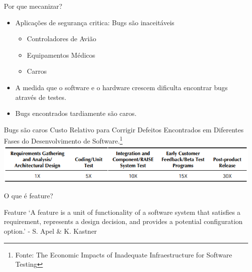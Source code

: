 \documentclass{beamer}
\begin{document}
    \begin{frame}{Por que mecanizar?}
        \begin{itemize}
            \item Aplicações de segurança critica: Bugs são inaceitáveis
            \begin{itemize}
                \item Controladores de Avião
                \item Equipamentos Médicos
                \item Carros
            \end{itemize}
        \item A medida que o software e o hardware crescem dificulta encontrar
            bugs através de testes.
        \item Bugs encontrados tardiamente são caros.
        \end{itemize}
    \end{frame}

    \begin{frame}{Bugs são caros}
        \centering
            Custo Relativo para Corrigir Defeitos Encontrados em
            Diferentes Fases do Desenvolvimento de Software.\footnote{Fonte: The Economic Impacts of Inadequate Infraestructure for Software Testing}\\

            \includegraphics[width=\textwidth]{custo_bug}
    \end{frame}

    \begin{frame}{O que é feature?}
        \centering
        \begin{block}{Feature}
            `A feature is a unit of functionality of a software system
            that satisfies a requirement, represents a design decision, and provides a potential
            configuration option.' - S. Apel \& K. Kastner
        \end{block}
    \end{frame}
\end{document}
